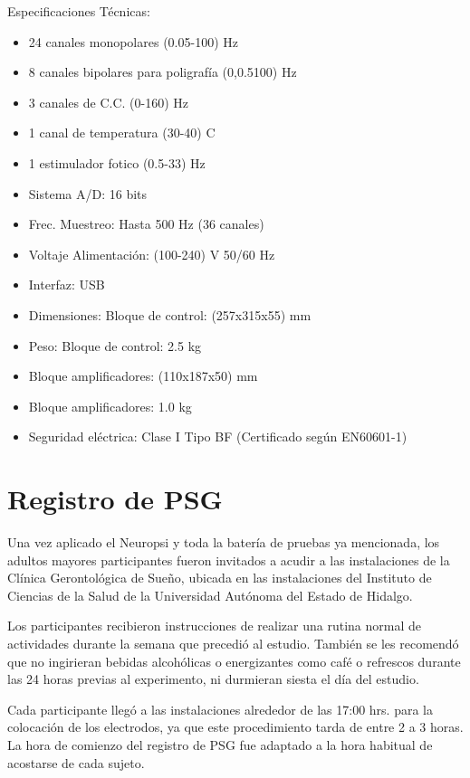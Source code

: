 Especificaciones T\'ecnicas:
\begin{itemize}
\item 24 canales monopolares (0.05-100) Hz
\item 8 canales bipolares para poligraf\'ia (0,0.5100) Hz
\item 3 canales de C.C. (0-160) Hz
\item 1 canal de temperatura (30-40) C
\item 1 estimulador fotico (0.5-33) Hz
\item Sistema A/D: 16 bits
\item Frec. Muestreo: Hasta 500 Hz (36 canales)
\item Voltaje Alimentaci\'on: (100-240) V 50/60 Hz
\item Interfaz: USB
\item Dimensiones: Bloque de control: (257x315x55) mm
\item Peso: Bloque de control: 2.5 kg
\item Bloque amplificadores: (110x187x50) mm
\item Bloque amplificadores: 1.0 kg
\item Seguridad el\'ectrica: Clase I Tipo BF (Certificado según EN60601-1)
\end{itemize}


\section{Registro de PSG}

Una vez aplicado el Neuropsi y toda la bater\'ia de pruebas ya mencionada, los adultos mayores
participantes fueron invitados a acudir a las instalaciones de la Cl\'inica Gerontol\'ogica de 
Sue\~no, ubicada en las instalaciones del Instituto de Ciencias de la Salud de la Universidad 
Aut\'onoma del Estado de Hidalgo.


Los participantes recibieron instrucciones de realizar una rutina normal de actividades durante la 
semana que precedi\'o al estudio. Tambi\'en se les recomend\'o que no ingirieran bebidas 
alcoh\'olicas o energizantes como caf\'e o refrescos durante las 24 horas previas al experimento, 
ni durmieran siesta el d\'ia del estudio. 


Cada participante lleg\'o a las instalaciones alrededor de las 17:00 hrs. para la colocaci\'on de 
los electrodos, ya que este procedimiento tarda de entre 2 a 3 horas. La hora de comienzo del 
registro de PSG fue adaptado a la hora habitual de acostarse de cada sujeto.

